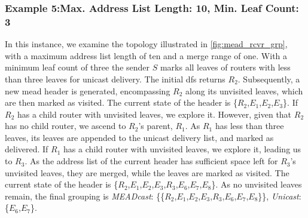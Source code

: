 \subsubsection{Example 5:\quad Max. Address List Length: 10, Min. Leaf Count: 3}
\label{sec:Max 10 Min Leaf 3}
In this instance, we examine the topology illustrated in \autoref{fig:mead_rcvr_grp},
    with a maximum address list length of ten and a merge range of one.
With a minimum leaf count of three the sender $S$ marks all leaves of routers with
    less than three leaves for unicast delivery.
The initial \gls{dfs} returns $R_2$.
Subsequently, a new \gls{mead} header is generated, encompassing $R_2$ along its
    unvisited leaves, which are then marked as visited.
The current state of the header is \{$R_2$,$E_1$,$E_2$,$E_3$\}.
If $R_2$ has a child router with unvisited leaves, we explore it.
However, given that $R_2$ has no child router, we ascend to $R_2$'s parent, $R_1$.
As $R_1$ has less than three leaves, its leaves are appended to the unicast
    delivery list, and marked as delivered.
If $R_1$ has a child router with unvisited leaves, we explore it, leading us to
    $R_3$.
As the address list of the current header has sufficient space left for $R_3$'s
    unvisited leaves, they are merged, while the leaves are marked as visited.
The current state of the header is
    \{$R_2$,$E_1$,$E_2$,$E_3$,$R_3$,$E_6$,$E_7$,$E_8$\}.
As no unvisited leaves remain, the final grouping is
    \textit{MEADcast}: \{\{$R_2$,$E_1$,$E_2$,$E_3$,$R_3$,$E_6$,$E_7$,$E_8$\}\},
    \textit{Unicast}: \{$E_6$,$E_7$\}.



